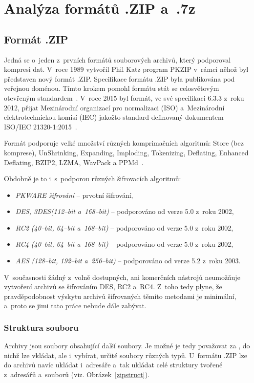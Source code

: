 \chapter{Analýza formátů .ZIP a~.7z}
\label{ch:formaty}
\section{Formát .ZIP}
Jedná se o~jeden z~prvních formátů souborových archivů, který podporoval kompresi dat. V~roce 1989
vytvořil Phil Katz program PKZIP v~rámci něhož byl představen nový formát .ZIP. Specifikace
formátu .ZIP byla publikována pod veřejnou doménou. Tímto krokem pomohl formátu stát se
celosvětovým otevřeným standardem~\cite{PKWARE:2015}. V~roce 2015 byl formát, ve své specifikaci
6.3.3 z~roku 2012, přijat Mezinárodní organizací pro normalizaci (ISO) a~Mezinárodní
elektrotechnickou komisí (IEC) jakožto standard definovaný dokumentem ISO/IEC
21320-1:2015~\cite{ISOIEC:2015}.

 Formát podporuje velké množství různých komprimačních algoritmů: Store (bez komprese),
UnShrinking, Expanding, Imploding, Tokenizing, Deflating, Enhanced Deflating, BZIP2, LZMA, WavPack
a PPMd~\cite{PKWARE:2014}. 

 Obdobně je to i~s~podporou různých šifrovacích algoritmů:
\begin{itemize}
    \item {\it PKWARE šifrování} -- prvotní šifrování,
    \item {\it DES, 3DES(112--bit a~168--bit)} -- podporováno od verze 5.0 z~roku 2002,
    \item {\it RC2 (40--bit, 64--bit a~168--bit)} -- podporováno od verze 5.0 z~roku 2002,
    \item {\it RC4 (40--bit, 64--bit a~168--bit)} -- podporováno od verze 5.0 z~roku 2002,
    \item {\it AES (128--bit, 192--bit a~256--bit)} -- podporováno od verze 5.2 z~roku 2003.
\end{itemize}
V~současnosti žádný z~volně dostupných, ani komerčních nástrojů neumožňuje vytvoření archivů se
šifrováním DES, RC2 a~RC4. Z~toho tedy plyne, že pravděpodobnost výskytu archivů šifrovaných
těmito metodami je minimální, a~proto se jimi tato práce nebude dále zabývat.

\subsection{Struktura souboru}
\label{ssec:zip_struct}
Archivy jsou soubory obsahující další soubory. Je možné je tedy považovat za , do
nichž lze vkládat, ale i~vybírat, určité soubory různých typů. U~formátu .ZIP lze do archivů
navíc ukládat i~adresáře a~tak ukládat celé struktury tvořené z~adresářů a~souborů (viz.
Obrázek~\ref{zipstruct}).

